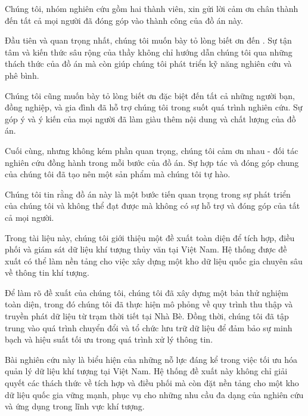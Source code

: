 \begin{acknowledgments}

Chúng tôi, nhóm nghiên cứu gồm hai thành viên, xin gửi lời cảm ơn chân thành đến tất cả mọi người đã đóng góp vào thành công của đồ án này.

Đầu tiên và quan trọng nhất, chúng tôi muốn bày tỏ lòng biết ơn đến \Proc. Sự tận tâm và kiến thức sâu rộng của thầy không chỉ hướng dẫn chúng tôi qua những thách thức của đồ án mà còn giúp chúng tôi phát triển kỹ năng nghiên cứu và phê bình.

Chúng tôi cũng muốn bày tỏ lòng biết ơn đặc biệt đến tất cả những người bạn, đồng nghiệp, và gia đình đã hỗ trợ chúng tôi trong suốt quá trình nghiên cứu. Sự góp ý và ý kiến của mọi người đã làm giàu thêm nội dung và chất lượng của đồ án.

Cuối cùng, nhưng không kém phần quan trọng, chúng tôi cảm ơn nhau - đối tác nghiên cứu đồng hành trong mỗi bước của đồ án. Sự hợp tác và đóng góp chung của chúng tôi đã tạo nên một sản phẩm mà chúng tôi tự hào.

Chúng tôi tin rằng đồ án này là một bước tiến quan trọng trong sự phát triển của chúng tôi và không thể đạt được mà không có sự hỗ trợ và đóng góp của tất cả mọi người.

\end{acknowledgments}
\newpage
\begin{abstr}
Trong tài liệu này, chúng tôi giới thiệu một đề xuất toàn diện để tích hợp, điều phối và giám sát dữ liệu khí tượng thủy văn tại Việt Nam. Hệ thống được đề xuất có thể làm nền tảng cho việc xây dựng một kho dữ liệu quốc gia chuyên sâu về thông tin khí tượng.

Để làm rõ đề xuất của chúng tôi, chúng tôi đã xây dựng một bản thử nghiệm toàn diện, trong đó chúng tôi đã thực hiện mô phỏng về quy trình thu thập và truyền phát dữ liệu từ trạm thời tiết tại Nhà Bè. Đồng thời, chúng tôi đã tập trung vào quá trình chuyển đổi và tổ chức lưu trữ dữ liệu để đảm bảo sự minh bạch và hiệu suất tối ưu trong quá trình xử lý thông tin.

Bài nghiên cứu này là biểu hiện của những nỗ lực đáng kể trong việc tối ưu hóa quản lý dữ liệu khí tượng tại Việt Nam. Hệ thống đề xuất này không chỉ giải quyết các thách thức về tích hợp và điều phối mà còn đặt nền tảng cho một kho dữ liệu quốc gia vững mạnh, phục vụ cho những nhu cầu đa dạng của nghiên cứu và ứng dụng trong lĩnh vực khí tượng.

\end{abstr}	


